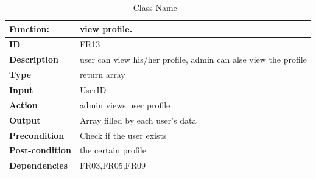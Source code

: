 \documentclass[]{article}
\begin{document}
\FloatBarrier
\begin{table}[h]
\caption{Class Name - }
\label{tab:my-table}
\begin{tabular}{|p{}|p{}|}
\hline
\textbf{Function:} & view profile.
\\ \hline
\textbf{ID}  & FR13         

\\ \hline
\textbf{Description}    & user can view his/her profile, admin can alse view the profile                                                                  
\\ \hline
\textbf{Type}    &  return array       

\\ \hline
\textbf{Input}        & UserID


\\ \hline
\textbf{Action}            & admin views user profile

\\ \hline
\textbf{Output}            & Array filled by each user’s data

\\ \hline
\textbf{Precondition}           & Check if the user exists  

\\ \hline
\textbf{Post-condition}           &  the certain profile


\\ \hline
\textbf{Dependencies}           & FR03,FR05,FR09
\\ \hline
\end{tabular}
\end{table}
\end{document}
